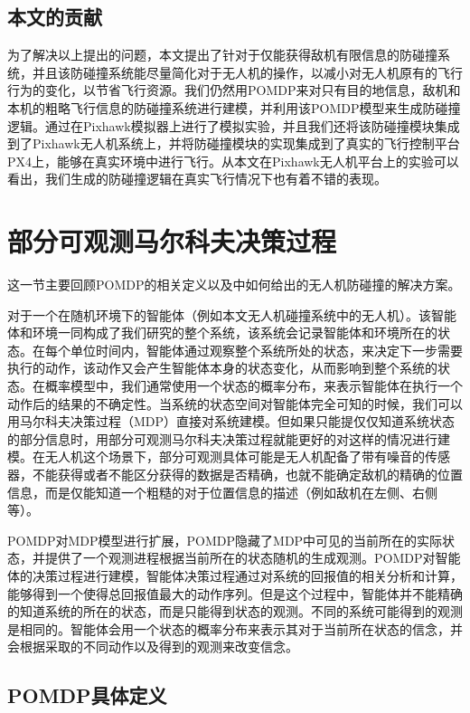\documentclass{article}
\begin{document}
\subsection{本文的贡献}

为了解决以上提出的问题，本文提出了针对于仅能获得敌机有限信息的防碰撞系统，并且该防碰撞系统能尽量简化对于无人机的操作，以减小对无人机原有的飞行行为的变化，以节省飞行资源。我们仍然用POMDP来对只有目的地信息，敌机和本机的粗略飞行信息的防碰撞系统进行建模，并利用该POMDP模型来生成防碰撞逻辑。通过在Pixhawk模拟器上进行了模拟实验，并且我们还将该防碰撞模块集成到了Pixhawk无人机系统上，并将防碰撞模块的实现集成到了真实的飞行控制平台PX4上，能够在真实环境中进行飞行。从本文在Pixhawk无人机平台上的实验可以看出，我们生成的防碰撞逻辑在真实飞行情况下也有着不错的表现。



\section{部分可观测马尔科夫决策过程}
这一节主要回顾POMDP的相关定义以及\cite{1}中如何给出的无人机防碰撞的解决方案。

对于一个在随机环境下的智能体（例如本文无人机碰撞系统中的无人机）。该智能体和环境一同构成了我们研究的整个系统，该系统会记录智能体和环境所在的状态。在每个单位时间内，智能体通过观察整个系统所处的状态，来决定下一步需要执行的动作，该动作又会产生智能体本身的状态变化，从而影响到整个系统的状态。在概率模型中，我们通常使用一个状态的概率分布，来表示智能体在执行一个动作后的结果的不确定性。当系统的状态空间对智能体完全可知的时候，我们可以用马尔科夫决策过程（MDP）直接对系统建模\cite{15}。但如果只能提仅仅知道系统状态的部分信息时，用部分可观测马尔科夫决策过程就能更好的对这样的情况进行建模。在无人机这个场景下，部分可观测具体可能是无人机配备了带有噪音的传感器，不能获得或者不能区分获得的数据是否精确，也就不能确定敌机的精确的位置信息，而是仅能知道一个粗糙的对于位置信息的描述（例如敌机在左侧、右侧等）。

POMDP对MDP模型进行扩展，POMDP隐藏了MDP中可见的当前所在的实际状态，并提供了一个观测进程根据当前所在的状态随机的生成观测。POMDP对智能体的决策过程进行建模，智能体决策过程通过对系统的回报值的相关分析和计算，能够得到一个使得总回报值最大的动作序列。但是这个过程中，智能体并不能精确的知道系统的所在的状态，而是只能得到状态的观测。不同的系统可能得到的观测是相同的。智能体会用一个状态的概率分布来表示其对于当前所在状态的信念，并会根据采取的不同动作以及得到的观测来改变信念。

\subsection{POMDP具体定义}
\end{document}
